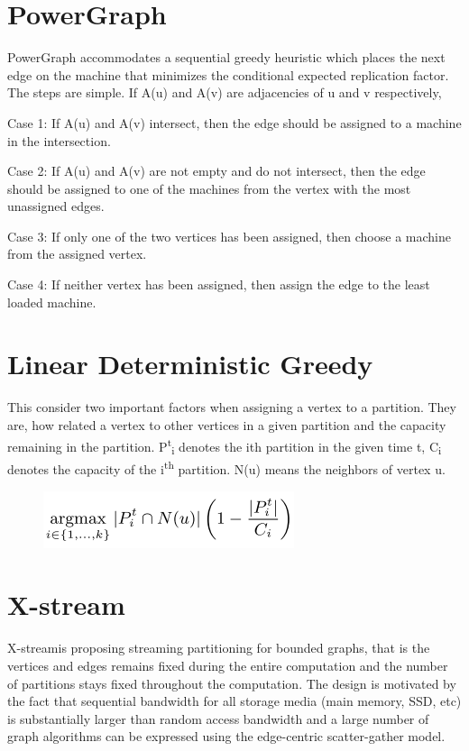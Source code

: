 \section{PowerGraph}
PowerGraph\cite{PowerGraph} accommodates a sequential greedy heuristic which places the next edge on the machine that minimizes the conditional expected replication factor. The steps are simple.  If A(u) and A(v) are adjacencies of u and v respectively,

Case 1: If A(u) and A(v) intersect, then the edge should be assigned to a machine in the intersection.

Case 2: If A(u) and A(v) are not empty and do not intersect, then the edge should be assigned to one of the machines from the vertex with the most unassigned edges.

Case 3: If only one of the two vertices has been assigned, then choose a machine from the assigned vertex.

Case 4: If neither vertex has been assigned, then assign the edge to the least loaded machine.

\section{Linear Deterministic Greedy}
This consider two important factors when  assigning a vertex to a partition.  They are, how related a vertex to other vertices in a given partition and the capacity remaining in the partition. P\textsuperscript{t}\textsubscript{i}  denotes the ith partition in the given time t, C\textsubscript{i} denotes the capacity of the i\textsuperscript{th} partition. N(u) means the neighbors of vertex u. 

\begin{figure}[H]
\centering
\includegraphics[scale=0.5]{images/image07}
\end{figure}

\section{X-stream}
X-stream\cite{XStream}is proposing streaming partitioning for bounded graphs, that is the vertices and edges remains fixed during the entire computation and the number of partitions stays fixed throughout the computation. The design is motivated by the fact that sequential bandwidth for all storage media (main memory, SSD, etc) is substantially larger than random access bandwidth and a large number of graph algorithms can be expressed using the edge-centric scatter-gather model. 

